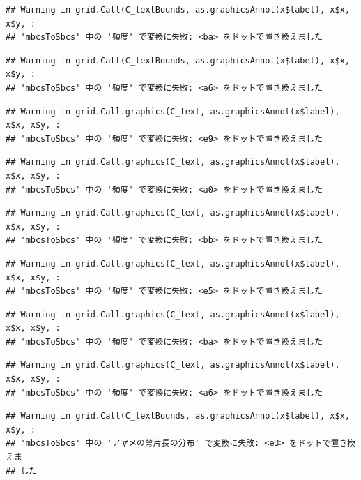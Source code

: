 \documentclass[
]{book}
\begin{document}
\begin{verbatim}
## Warning in grid.Call(C_textBounds, as.graphicsAnnot(x$label), x$x, x$y, :
## 'mbcsToSbcs' 中の '頻度' で変換に失敗: <ba> をドットで置き換えました
\end{verbatim}

\begin{verbatim}
## Warning in grid.Call(C_textBounds, as.graphicsAnnot(x$label), x$x, x$y, :
## 'mbcsToSbcs' 中の '頻度' で変換に失敗: <a6> をドットで置き換えました
\end{verbatim}

\begin{verbatim}
## Warning in grid.Call.graphics(C_text, as.graphicsAnnot(x$label), x$x, x$y, :
## 'mbcsToSbcs' 中の '頻度' で変換に失敗: <e9> をドットで置き換えました
\end{verbatim}

\begin{verbatim}
## Warning in grid.Call.graphics(C_text, as.graphicsAnnot(x$label), x$x, x$y, :
## 'mbcsToSbcs' 中の '頻度' で変換に失敗: <a0> をドットで置き換えました
\end{verbatim}

\begin{verbatim}
## Warning in grid.Call.graphics(C_text, as.graphicsAnnot(x$label), x$x, x$y, :
## 'mbcsToSbcs' 中の '頻度' で変換に失敗: <bb> をドットで置き換えました
\end{verbatim}

\begin{verbatim}
## Warning in grid.Call.graphics(C_text, as.graphicsAnnot(x$label), x$x, x$y, :
## 'mbcsToSbcs' 中の '頻度' で変換に失敗: <e5> をドットで置き換えました
\end{verbatim}

\begin{verbatim}
## Warning in grid.Call.graphics(C_text, as.graphicsAnnot(x$label), x$x, x$y, :
## 'mbcsToSbcs' 中の '頻度' で変換に失敗: <ba> をドットで置き換えました
\end{verbatim}

\begin{verbatim}
## Warning in grid.Call.graphics(C_text, as.graphicsAnnot(x$label), x$x, x$y, :
## 'mbcsToSbcs' 中の '頻度' で変換に失敗: <a6> をドットで置き換えました
\end{verbatim}

\begin{verbatim}
## Warning in grid.Call(C_textBounds, as.graphicsAnnot(x$label), x$x, x$y, :
## 'mbcsToSbcs' 中の 'アヤメの萼片長の分布' で変換に失敗: <e3> をドットで置き換えま
## した
\end{verbatim}
\end{document}
